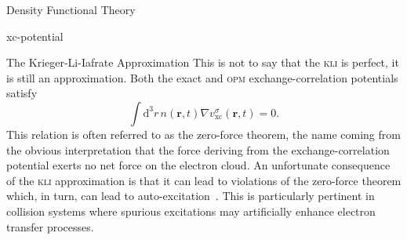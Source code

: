 \documentclass[letterpaper, 11 pt]{report}
\begin{document}
\begin{chapter}{Density Functional Theory \label{chap:dft}}
\begin{section}{xc-potential \label{sec:xcpot}}
\begin{subsection}{The Krieger-Li-Iafrate Approximation \label{sec:kli}}
         This is not to say that the \textsc{kli} is perfect, it is still an approximation. Both the
         exact and \textsc{opm} exchange-correlation potentials satisfy
         \begin{equation} \label{eq:zft}
            \int \mathrm{d}^3 r \, n(\mathbf{r}, t) \nabla v^\sigma_\mathrm{xc}(\mathbf{r},t) = 0.
         \end{equation}
         This relation is often referred to as the zero-force theorem, the name coming from the obvious
         interpretation that the force deriving from the exchange-correlation potential exerts no net
         force on the electron cloud. An unfortunate consequence of the \textsc{kli} approximation is
         that it can lead to violations of the zero-force theorem which, in turn, can lead to
         auto-excitation~\cite{kli-zero-force}. This is particularly pertinent in collision systems
         where spurious excitations may artificially enhance electron transfer processes.

      \end{subsection}

   \end{section}

\end{chapter}
\end{document}
